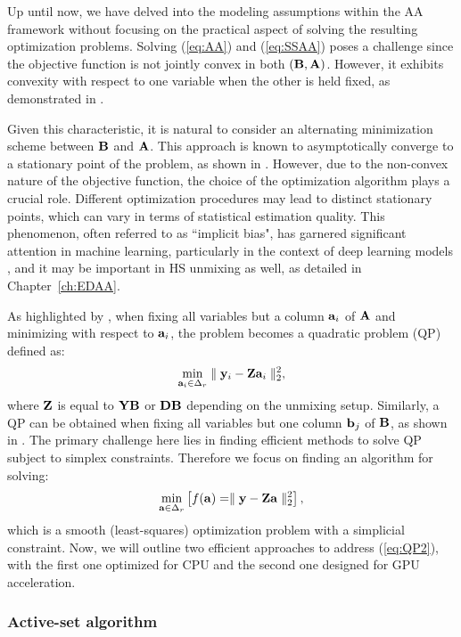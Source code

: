 Up until now, we have delved into the modeling assumptions within the AA framework without focusing on the practical aspect of solving the resulting optimization problems.
Solving (\ref{eq:AA}) and (\ref{eq:SSAA}) poses a challenge since the objective function is not jointly convex in both $(\mathbf B, \mathbf A)$.
However, it exhibits convexity with respect to one variable when the other is held fixed, as demonstrated in \cite{morup_archetypal_2012}.

Given this characteristic, it is natural to consider an alternating minimization scheme between $\mathbf B$ and $\mathbf A$. This approach is known to asymptotically converge to a stationary point of the problem, as shown in \cite{bertsekas_nonlinear_1997}.
However, due to the non-convex nature of the objective function, the choice of the optimization algorithm plays a crucial role.
Different optimization procedures may lead to distinct stationary points, which can vary in terms of statistical estimation quality.
This phenomenon, often referred to as ``implicit bias", has garnered significant attention in machine learning, particularly in the context of deep learning models \cite{pesme_implicit_2021}, and it may be important in HS unmixing as well, as detailed in Chapter~\ref{ch:EDAA}.

As highlighted by \cite{cutler_archetypal_1994}, when fixing all variables but a column $\mathbf a_i$ of $\mathbf A$ and minimizing with respect to $\mathbf a_i$, the problem becomes a quadratic problem (QP) defined as:
\begin{equation}
    \label{eq:QP}
    \min_{\mathbf a_i \in \Delta_r} \parallel \mathbf y_i - \mathbf Z \mathbf a_i \parallel_2^2,
\end{equation}
where $\mathbf Z$ is equal to $\mathbf Y \mathbf B$ or $\mathbf D \mathbf B$ depending on the unmixing setup.
Similarly, a QP can be obtained when fixing all variables but one column $\mathbf b_j$ of $\mathbf B$, as shown in \cite{chen_fast_2014}.
The primary challenge here lies in finding efficient methods to solve QP subject to simplex constraints.
Therefore we focus on finding an algorithm for solving:
\begin{equation}
    \label{eq:QP2}
    \min_{\mathbf a \in \Delta_r} \left[f(\mathbf a) = \parallel \mathbf y - \mathbf Z \mathbf a \parallel_2^2\right],
\end{equation}
which is a smooth (least-squares) optimization problem with a simplicial constraint.
Now, we will outline two efficient approaches to address (\ref{eq:QP2}), with the first one optimized for CPU and the second one designed for GPU acceleration.

\subsubsection{Active-set algorithm}

